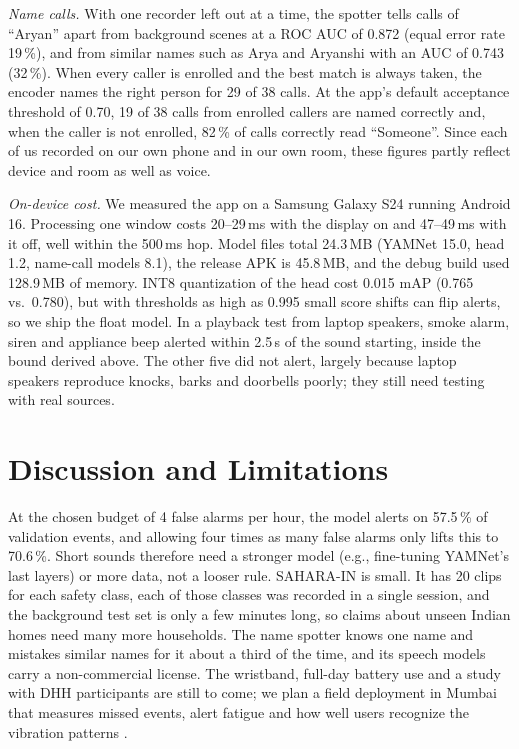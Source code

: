 \documentclass[conference,a4paper]{IEEEtran}
\begin{document}
\textit{Name calls.} With one recorder left out at a time, the spotter tells calls of ``Aryan'' apart from background scenes at a ROC AUC of 0.872 (equal error rate 19\,\%), and from similar names such as Arya and Aryanshi with an AUC of 0.743 (32\,\%). When every caller is enrolled and the best match is always taken, the encoder names the right person for 29 of 38 calls. At the app's default acceptance threshold of 0.70, 19 of 38 calls from enrolled callers are named correctly and, when the caller is not enrolled, 82\,\% of calls correctly read ``Someone''. Since each of us recorded on our own phone and in our own room, these figures partly reflect device and room as well as voice.

\textit{On-device cost.} We measured the app on a Samsung Galaxy S24 running Android 16. Processing one window costs 20--29\,ms with the display on and 47--49\,ms with it off, well within the 500\,ms hop. Model files total 24.3\,MB (YAMNet 15.0, head 1.2, name-call models 8.1), the release APK is 45.8\,MB, and the debug build used 128.9\,MB of memory. INT8 quantization of the head cost 0.015 mAP (0.765 vs.\ 0.780), but with thresholds as high as 0.995 small score shifts can flip alerts, so we ship the float model. In a playback test from laptop speakers, smoke alarm, siren and appliance beep alerted within 2.5\,s of the sound starting, inside the bound derived above. The other five did not alert, largely because laptop speakers reproduce knocks, barks and doorbells poorly; they still need testing with real sources.

\section{Discussion and Limitations}
At the chosen budget of 4 false alarms per hour, the model alerts on 57.5\,\% of validation events, and allowing four times as many false alarms only lifts this to 70.6\,\%. Short sounds therefore need a stronger model (e.g., fine-tuning YAMNet's last layers) or more data, not a looser rule. SAHARA-IN is small. It has 20 clips for each safety class, each of those classes was recorded in a single session, and the background test set is only a few minutes long, so claims about unseen Indian homes need many more households. The name spotter knows one name and mistakes similar names for it about a third of the time, and its speech models carry a non-commercial license. The wristband, full-day battery use and a study with DHH participants are still to come; we plan a field deployment in Mumbai that measures missed events, alert fatigue and how well users recognize the vibration patterns \cite{findlater2019,huang2023}.
\end{document}
